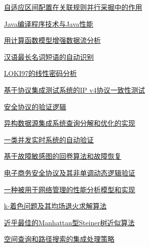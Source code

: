 \documentclass[a4paper]{article}
\begin{document}
\href{http://www.jos.org.cn/ch/reader/download_pdf.aspx?file_no=20000202&year_id=2000&quarter_id=2&falg=1}{自适应区间配置在关联规则并行采掘中的作用}

\href{http://www.jos.org.cn/ch/reader/download_pdf.aspx?file_no=20000203&year_id=2000&quarter_id=2&falg=1}{Java编译程序技术与Java性能}

\href{http://www.jos.org.cn/ch/reader/download_pdf.aspx?file_no=20000205&year_id=2000&quarter_id=2&falg=1}{用计算函数模型增强数据流分析}

\href{http://www.jos.org.cn/ch/reader/download_pdf.aspx?file_no=20000206&year_id=2000&quarter_id=2&falg=1}{汉语最长名词短语的自动识别}

\href{http://www.jos.org.cn/ch/reader/download_pdf.aspx?file_no=20000207&year_id=2000&quarter_id=2&falg=1}{LOKI97的线性密码分析}

\href{http://www.jos.org.cn/ch/reader/download_pdf.aspx?file_no=20000208&year_id=2000&quarter_id=2&falg=1}{基于协议集成测试系统的IP v4协议一致性测试}

\href{http://www.jos.org.cn/ch/reader/download_pdf.aspx?file_no=20000209&year_id=2000&quarter_id=2&falg=1}{安全协议的验证逻辑}

\href{http://www.jos.org.cn/ch/reader/download_pdf.aspx?file_no=20000210&year_id=2000&quarter_id=2&falg=1}{异构数据源集成系统查询分解和优化的实现}

\href{http://www.jos.org.cn/ch/reader/download_pdf.aspx?file_no=20000211&year_id=2000&quarter_id=2&falg=1}{一类并发实时系统的自动验证}

\href{http://www.jos.org.cn/ch/reader/download_pdf.aspx?file_no=20000212&year_id=2000&quarter_id=2&falg=1}{基于故障敏感图的回卷算法和故障恢复}

\href{http://www.jos.org.cn/ch/reader/download_pdf.aspx?file_no=20000213&year_id=2000&quarter_id=2&falg=1}{电子商务安全协议及其非单调动态逻辑验证}

\href{http://www.jos.org.cn/ch/reader/download_pdf.aspx?file_no=20000214&year_id=2000&quarter_id=2&falg=1}{一种被用于网络管理的性能分析模型和实现}

\href{http://www.jos.org.cn/ch/reader/download_pdf.aspx?file_no=20000215&year_id=2000&quarter_id=2&falg=1}{k-着色问题及其均场退火求解算法}

\href{http://www.jos.org.cn/ch/reader/download_pdf.aspx?file_no=20000216&year_id=2000&quarter_id=2&falg=1}{近乎最佳的Manhattan型Steiner树近似算法}

\href{http://www.jos.org.cn/ch/reader/download_pdf.aspx?file_no=20000217&year_id=2000&quarter_id=2&falg=1}{空间查询和路径搜索的集成处理策略}
\end{document}
